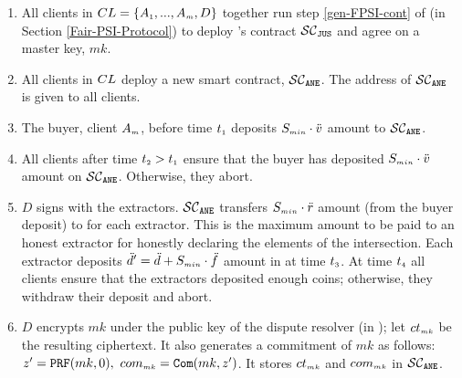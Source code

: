 \begin{enumerate}


\item\label{e-psi::call-F-PSI-stepOne}  All clients in ${CL}=\{ A_{\scriptscriptstyle 1},...,   A_{\scriptscriptstyle m},  D\}$ together run step \ref{gen-FPSI-cont} of \fpsi (in Section \ref{Fair-PSI-Protocol}) to deploy \fpsi's contract $\mathcal{SC}_{\mathtt{JUS}}$ and agree on a  master key, $mk$. 

\item\label{e-psi::deploy-SC-E-PSI} All clients in ${CL}$  deploy a new smart contract, $\mathcal{SC}_{\mathtt{ANE}}$. The address of $\mathcal{SC}_{\mathtt{ANE}}$ is given to all clients. 

\item The buyer, client $ { A}_{\scriptscriptstyle {  m}}$, before time $t_{\scriptscriptstyle 1}$ deposits $S_{\scriptscriptstyle min}\cdot \ddot{v}$  amount to $\mathcal{SC}_{\mathtt{ANE}}$. 
\item\label{e-PSI::buyer-deposit} All clients after  time $t_{\scriptscriptstyle 2}>t_{\scriptscriptstyle 1}$ ensure that the buyer has deposited $S_{\scriptscriptstyle min}\cdot \ddot{v}$ amount on $\mathcal{SC}_{\mathtt{ANE}}$. Otherwise, they abort.



\item\label{e-PSI::extractor-deposit} $D$ signs \SCpc with the extractors. $\mathcal{SC}_{\mathtt{ANE}}$ transfers $S_{\scriptscriptstyle min}\cdot \ddot{r}$ amount (from the buyer deposit) to \SCpc for each extractor. This is the maximum amount to be paid to an honest extractor for honestly declaring the elements of the intersection. %
%
Each extractor  deposits $\ddot{d}'=\ddot{d}+S_{\scriptscriptstyle min}\cdot \ddot{f}$ amount in \SCpc at time $t_{\scriptscriptstyle 3}$. At time $t_{\scriptscriptstyle 4}$ all clients ensure that the extractors deposited enough coins; otherwise, they withdraw their deposit and abort. 

%
\item\label{e-psi::commit-to-mk} $D$ encrypts $mk$ under the public key of the dispute resolver (in \SCpc); let $ct_{\scriptscriptstyle mk}$ be the resulting ciphertext.  It also generates a commitment of $mk$ as follows: $z'=\mathtt{PRF}(mk, 0),\ com_{\scriptscriptstyle mk}=\mathtt{Com}(mk, z')$. It stores $ct_{\scriptscriptstyle mk}$  and ${com}_{\scriptscriptstyle mk}$ in $\mathcal{SC}_{\mathtt{ANE}}$. 



\end{enumerate}
